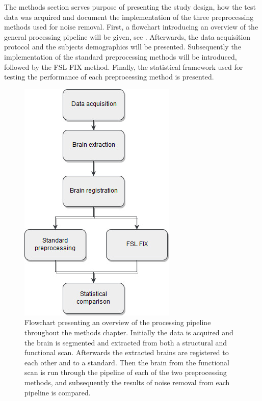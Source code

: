 
The methods section serves purpose of presenting the study design, how the test data was acquired and document the implementation of the three preprocessing methods used for noise removal. First, a flowchart introducing an overview of the general processing pipeline will be given, see . Afterwards, the data acquisition protocol and the subjects demographics will be presented. Subsequently the implementation of the standard preprocessing methods will be introduced, followed by the FSL FIX method. Finally, the statistical framework used for testing the performance of each preprocessing method is presented. 

\begin{figure}[H]                 
	\includegraphics[width=.37\textwidth]{figures/bMethods/Flowchart_intro}  
	\caption{Flowchart presenting an overview of the processing pipeline throughout the methods chapter. Initially the data is acquired and the brain is segmented and extracted from both a structural and functional scan. Afterwards the extracted brains are registered to each other and to a standard. Then the brain from the functional scan is run through the pipeline of each of the two preprocessing methods, and subsequently the results of noise removal from each pipeline is compared.}
	\label{fig:meth:overview} 
\end{figure}
 